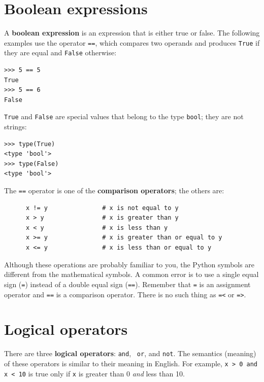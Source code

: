 \documentclass[10pt]{book}
\begin{document}
\section{Boolean expressions}

A {\bf boolean expression} is an expression that is either true
or false.  The following examples use the 
operator {\tt ==}, which compares two operands and produces
{\tt True} if they are equal and {\tt False} otherwise:

\beforeverb
\begin{verbatim}
>>> 5 == 5
True
>>> 5 == 6
False
\end{verbatim}
\afterverb
%
{\tt True} and {\tt False} are special
values that belong to the type {\tt bool}; they are not strings:


\beforeverb
\begin{verbatim}
>>> type(True)
<type 'bool'>
>>> type(False)
<type 'bool'>
\end{verbatim}
\afterverb
%
The {\tt ==} operator is one of the {\bf comparison operators}; the
others are:

\beforeverb
\begin{verbatim}
      x != y               # x is not equal to y
      x > y                # x is greater than y
      x < y                # x is less than y
      x >= y               # x is greater than or equal to y
      x <= y               # x is less than or equal to y
\end{verbatim}
\afterverb
%
Although these operations are probably familiar to you, the Python
symbols are different from the mathematical symbols.  A common error
is to use a single equal sign ({\tt =}) instead of a double equal sign
({\tt ==}).  Remember that {\tt =} is an assignment operator and
{\tt ==} is a comparison operator.   There is no such thing as
{\tt =<} or {\tt =>}.



\section {Logical operators}

There are three {\bf logical operators}: {\tt and}, {\tt
or}, and {\tt not}.  The semantics (meaning) of these operators is
similar to their meaning in English.  For example,
{\tt x > 0 and x < 10} is true only if {\tt x} is greater than 0
{\em and} less than 10.
\end{document}
